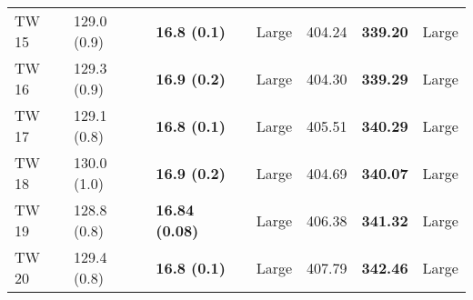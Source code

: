 \begin{tabular}{lllllll}
 TW 15 &       129.0 (0.9) &    \textbf{16.8 (0.1)} &       Large &                  404.24 &          \textbf{339.20} &       Large \\
 TW 16 &       129.3 (0.9) &    \textbf{16.9 (0.2)} &       Large &                  404.30 &          \textbf{339.29} &       Large \\
 TW 17 &       129.1 (0.8) &    \textbf{16.8 (0.1)} &       Large &                  405.51 &          \textbf{340.29} &       Large \\
 TW 18 &       130.0 (1.0) &    \textbf{16.9 (0.2)} &       Large &                  404.69 &          \textbf{340.07} &       Large \\
 TW 19 &       128.8 (0.8) &  \textbf{16.84 (0.08)} &       Large &                  406.38 &          \textbf{341.32} &       Large \\
 TW 20 &       129.4 (0.8) &    \textbf{16.8 (0.1)} &       Large &                  407.79 &          \textbf{342.46} &       Large \\
\bottomrule
\end{tabular}
